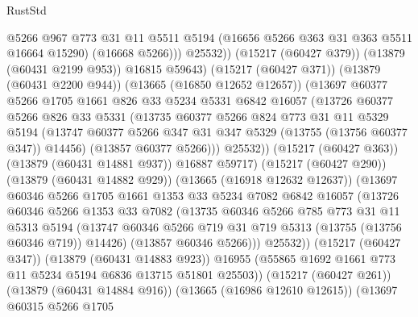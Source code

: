 \begin{lexlean}{RustStd}
\begin{coremodule}
                        @5266
                        @967
                        @773
                        @31
                        @11
                        @5511
                        @5194
                        (@16656 @5266 @363 @31 @363 @5511 @16664 @15290)
                        (@16668 @5266)))
                    @25532))
                (@15217 (@60427 @379))
                (@13879 (@60431 @2199 @953))
                @16815
                @59643)
              (@15217 (@60427 @371))
              (@13879 (@60431 @2200 @944))
              (@13665 (@16850 @12652 @12657))
              (@13697
                @60377
                @5266
                @1705
                @1661
                @826
                @33
                @5234
                @5331
                @6842
                @16057
                (@13726
                  @60377
                  @5266
                  @826
                  @33
                  @5331
                  (@13735
                    @60377
                    @5266
                    @824
                    @773
                    @31
                    @11
                    @5329
                    @5194
                    (@13747 @60377 @5266 @347 @31 @347 @5329 (@13755 (@13756 @60377 @347)) @14456)
                    (@13857 @60377 @5266)))
                @25532))
            (@15217 (@60427 @363))
            (@13879 (@60431 @14881 @937))
            @16887
            @59717)
          (@15217 (@60427 @290))
          (@13879 (@60431 @14882 @929))
          (@13665 (@16918 @12632 @12637))
          (@13697
            @60346
            @5266
            @1705
            @1661
            @1353
            @33
            @5234
            @7082
            @6842
            @16057
            (@13726
              @60346
              @5266
              @1353
              @33
              @7082
              (@13735
                @60346
                @5266
                @785
                @773
                @31
                @11
                @5313
                @5194
                (@13747 @60346 @5266 @719 @31 @719 @5313 (@13755 (@13756 @60346 @719)) @14426)
                (@13857 @60346 @5266)))
            @25532))
        (@15217 (@60427 @347))
        (@13879 (@60431 @14883 @923))
        @16955
        (@55865 @1692 @1661 @773 @11 @5234 @5194 @6836 @13715 @51801 @25503))
      (@15217 (@60427 @261))
      (@13879 (@60431 @14884 @916))
      (@13665 (@16986 @12610 @12615))
      (@13697
        @60315
        @5266
        @1705

\end{coremodule}
\end{lexlean}
